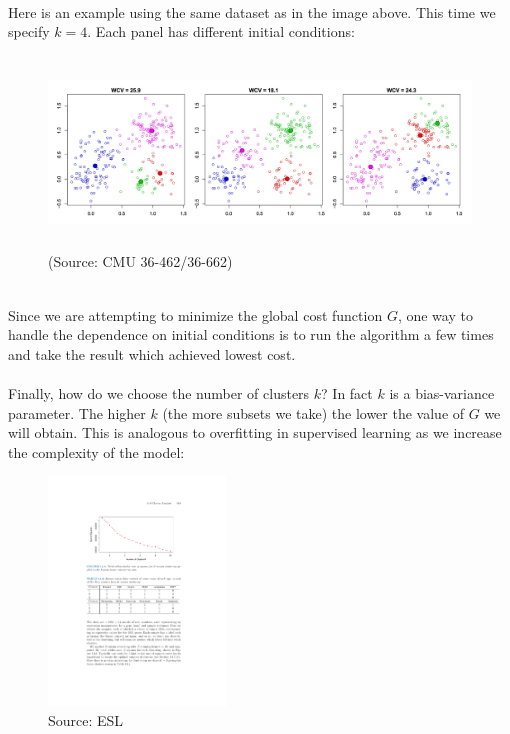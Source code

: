~\\Here is an example using the same dataset as in the image above. This
        time we specify $k=4$. Each panel has different initial conditions:

  \begin{figure}[H]
      \centering
      \includegraphics[height=2in]{kmeans_iter.jpeg}        
      \caption{(Source: CMU 36-462/36-662)}
    \end{figure}
~\\
Since we are attempting to minimize the global cost function $G$, one
    way to handle the dependence on initial conditions is to run the algorithm a few times and take the result which
    achieved lowest cost.
\\~\\
Finally, how do we choose the number of clusters $k$? In fact $k$ is a
bias-variance parameter. The higher $k$ (the more subsets we take) the lower the
value of $G$ we will obtain. This is analogous to overfitting in supervised
learning as we increase the complexity of the model:
\begin{figure}[H]
      \centering
      \includegraphics[height=2.4in]{kmeans_k_ss.pdf}        
      \caption{Source: ESL}
    \end{figure}







